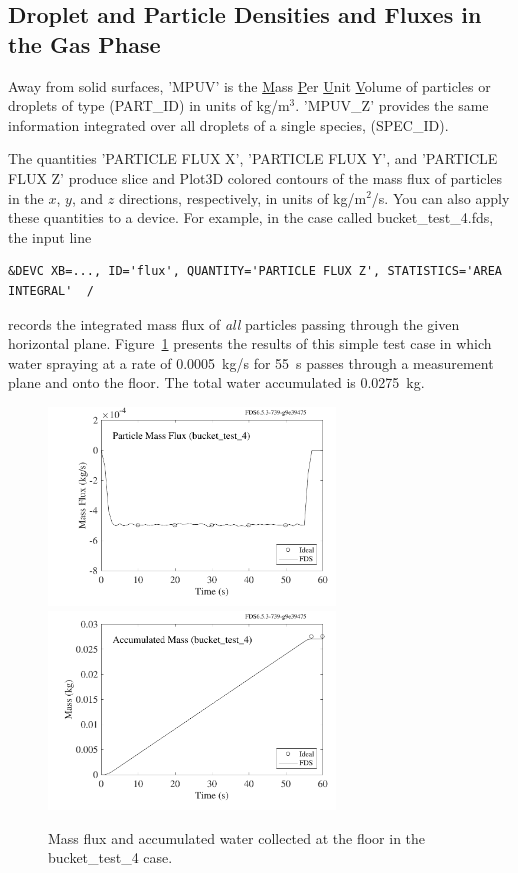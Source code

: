 \documentclass[11pt]{book}
\begin{document}
\subsection{Droplet and Particle Densities and Fluxes in the Gas Phase}

Away from solid surfaces, {\ct 'MPUV'} is the \underline{M}ass \underline{P}er \underline{U}nit \underline{V}olume of particles or droplets of type ({\ct PART\_ID}) in units of kg/m$^3$.  {\ct 'MPUV\_Z'} provides the same information integrated over all droplets of a single species, ({\ct SPEC\_ID}).

The quantities {\ct 'PARTICLE FLUX X'},  {\ct 'PARTICLE FLUX Y'}, and {\ct 'PARTICLE FLUX Z'} produce slice and Plot3D colored contours of the mass flux of particles in the $x$, $y$, and $z$ directions, respectively, in units of kg/m$^2$/s. You can also apply these quantities to a device. For example, in the case called {\ct bucket\_test\_4.fds}, the input line
\begin{lstlisting}
&DEVC XB=..., ID='flux', QUANTITY='PARTICLE FLUX Z', STATISTICS='AREA INTEGRAL'  /
\end{lstlisting}
records the integrated mass flux of {\em all} particles passing through the given horizontal plane. Figure~\ref{bucket_test_4_fig} presents the results of this simple test case in which water spraying at a rate of 0.0005~kg/s for 55~s passes through a measurement plane and onto the floor. The total water accumulated is 0.0275~kg.

\begin{figure}[ht]
\includegraphics[width=3in]{SCRIPT_FIGURES/bucket_test_4b}
\includegraphics[width=3in]{SCRIPT_FIGURES/bucket_test_4}
\caption[Results of the {\ct bucket\_test\_4} case]{Mass flux and accumulated water collected at the floor in the {\ct bucket\_test\_4} case.}
\label{bucket_test_4_fig}
\end{figure}
\end{document}
